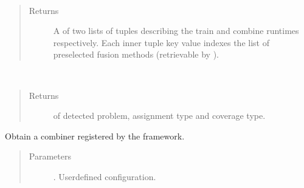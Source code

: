 \documentclass[letterpaper,10pt,english]{sphinxmanual}
\begin{document}
\begin{fulllineitems}
\begin{fulllineitems}
\label{\detokenize{pusion.auto.auto_combiner:pusion.auto.auto_combiner.AutoCombiner.get_multi_combiner_runtimes}}~\begin{quote}\begin{description}
\item[{Returns}] \leavevmode
\sphinxAtStartPar
A  of two lists of tuples describing the train and combine runtimes respectively.
Each inner tuple key value indexes the list of preselected fusion methods
(retrievable by ).

\end{description}\end{quote}

\end{fulllineitems}


\begin{fulllineitems}
\label{\detokenize{pusion.auto.auto_combiner:pusion.auto.auto_combiner.AutoCombiner.get_pac}}~\begin{quote}\begin{description}
\item[{Returns}] \leavevmode
\sphinxAtStartPar
{} of detected problem, assignment type and coverage type.

\end{description}\end{quote}

\end{fulllineitems}


\begin{fulllineitems}
\label{\detokenize{pusion.auto.auto_combiner:pusion.auto.auto_combiner.AutoCombiner.obtain}}
\sphinxAtStartPar
Obtain a combiner registered by the framework.
\begin{quote}\begin{description}
\item[{Parameters}] \leavevmode
\sphinxAtStartPar
{} \textendash{} {\hyperref[\detokenize{pusion.model.configuration:pusion.model.configuration.Configuration}]{}}. User\sphinxhyphen{}defined configuration.


\end{description}
\end{quote}
\end{fulllineitems}
\end{fulllineitems}
\end{document}
